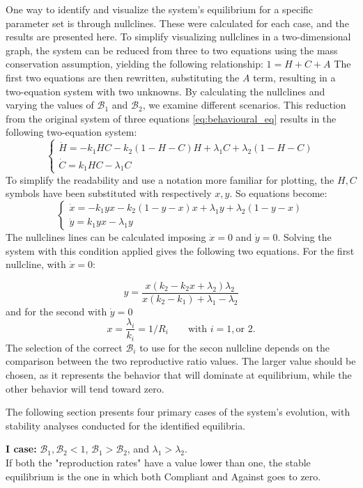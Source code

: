 One way to identify and visualize the system’s equilibrium for a specific parameter set is through nullclines. These were calculated for each case, and the results are presented here. To simplify visualizing nullclines in a two-dimensional graph, the system can be reduced from three to two equations using the mass conservation assumption, yielding the following relationship: $1=H+C+A$ The first two equations are then rewritten, substituting the $A$ term, resulting in a two-equation system with two unknowns. By calculating the nullclines and varying the values of $\mathcal{B}_1$ and $\mathcal{B}_2$, we examine different scenarios. This reduction from the original system of three equations \ref{eq:behavioural_eq}  results in the following two-equation system: 
\[
\begin{cases}
	\dot{H} = -k_1 H C - k_2 (1-H-C) H + \lambda_1 C + \lambda_2 (1-H-C)\\
	\dot{C} = k_1 H C - \lambda_1 C
\end{cases}
\]
To simplify the readability and use a notation more familiar for plotting, the $H, C$ symbols have been substituted with respectively $x, y$. So equations become:
\[
\begin{cases}
	\dot{x} = -k_1 y x - k_2 (1-y-x) x + \lambda_1 y + \lambda_2 (1-y-x)\\
	\dot{y} = k_1 y x - \lambda_1 y
\end{cases}
\]
The nullclines lines can be calculated imposing $\dot{x} = 0$ and $\dot{y} = 0$. Solving the system with this condition applied gives the following two equations. For the first nullcline, with $\dot{x} = 0$:

\begin{equation}
 y = \frac{x(k_2 - k_2 x + \lambda_2)  \lambda_2}{x(k_2 - k_1)+ \lambda_1- \lambda_2}
\end{equation}
and for the second with $\dot{y} = 0$
\[x = \frac{\lambda_i}{k_i} = 1/R_i \qquad \text{with } i = 1, \text{or } 2.
\]
The selection of the correct $\mathcal{B}_i$ to use for the secon nullcline depends on
the comparison between the two reproductive ratio values. The larger value should be chosen, as it represents the behavior that will dominate at equilibrium, while the other behavior will tend toward zero.

The following section presents four primary cases of the system’s evolution, with stability analyses conducted for the identified equilibria.

\textbf{I case: }$\mathcal{B}_1, \mathcal{B}_2 <1$, $\mathcal{B}_1 >  \mathcal{B}_2$, and $\lambda_1 > \lambda_2$. \\
If both the "reproduction rates" have a value lower than one, the stable equilibrium is the one in which both Compliant and Against goes to zero. 

